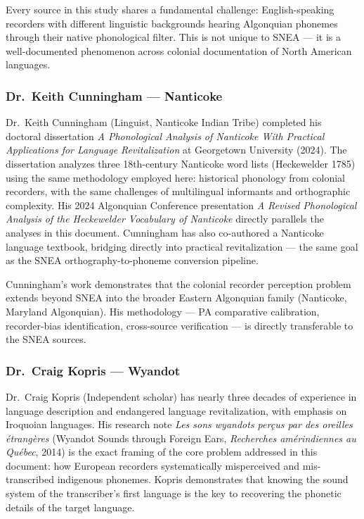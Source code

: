 Every source in this study shares a fundamental challenge: English-speaking
recorders with different linguistic backgrounds hearing Algonquian phonemes
through their native phonological filter. This is not unique to SNEA --- it is
a well-documented phenomenon across colonial documentation of North American
languages.

\subsubsection*{Dr.\ Keith Cunningham --- Nanticoke}

Dr.\ Keith Cunningham (Linguist, Nanticoke Indian Tribe) completed his
doctoral dissertation \emph{A Phonological Analysis of Nanticoke With
Practical Applications for Language Revitalization} at Georgetown University
(2024). The dissertation analyzes three 18th-century Nanticoke word lists
(Heckewelder 1785) using the same methodology employed here: historical
phonology from colonial recorders, with the same challenges of multilingual
informants and orthographic complexity. His 2024 Algonquian Conference
presentation \emph{A Revised Phonological Analysis of the Heckewelder
Vocabulary of Nanticoke} directly parallels the analyses in this document.
Cunningham has also co-authored a Nanticoke language textbook, bridging
directly into practical revitalization --- the same goal as the SNEA
orthography-to-phoneme conversion pipeline.

Cunningham's work demonstrates that the colonial recorder perception problem
extends beyond SNEA into the broader Eastern Algonquian family (Nanticoke,
Maryland Algonquian). His methodology --- PA comparative calibration,
recorder-bias identification, cross-source verification --- is directly
transferable to the SNEA sources.

\subsubsection*{Dr.\ Craig Kopris --- Wyandot}

Dr.\ Craig Kopris (Independent scholar) has nearly three decades of experience
in language description and endangered language revitalization, with emphasis
on Iroquoian languages. His research note \emph{Les sons wyandots per\c{c}us
par des oreilles \'etrang\`eres} (Wyandot Sounds through Foreign Ears,
\emph{Recherches am\'erindiennes au Qu\'ebec}, 2014) is the exact framing of
the core problem addressed in this document: how European recorders
systematically misperceived and mis-transcribed indigenous phonemes. Kopris
demonstrates that knowing the sound system of the transcriber's first language
is the key to recovering the phonetic details of the target language.


